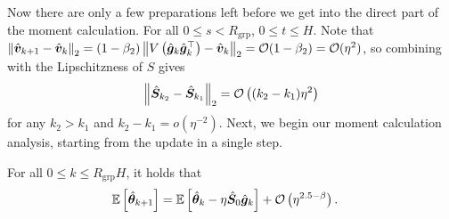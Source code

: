 Now there are only a few preparations left before we get into the direct part of the moment calculation. For all $0 \leq s < R_{\mathrm{grp}}$, $0 \leq t \leq H$. Note that $\left\|\hat{{\bm{v}}}_{k+1} - \hat{{\bm{v}}}_k\right\|_2 = (1-\beta_2) \left\|V\left(\hat{{\bm{g}}}_k\hat{{\bm{g}}}_k^\top\right) - \hat{{\bm{v}}}_k\right\|_2 = \mathcal{O}(1-\beta_2) = \mathcal{O}(\eta^2)$, so combining with the Lipschitzness of $S$ gives $$\left\|\hat{{\bm{S}}}_{k_2} - \hat{{\bm{S}}}_{k_1}\right\|_2 = \mathcal{O}\left((k_2 - k_1) \eta^2\right)$$ for any $k_2 > k_1$ and $k_2 - k_1 = o\left(\eta^{-2}\right)$. Next, we begin our moment calculation analysis, starting from the update in a single step.
\begin{lemma}\label{lma:update-rule}
    For all $0 \leq k \leq R_{\mathrm{grp}}H$, it holds that
    \begin{align*}
        \mathbb{E}\left[\hat{{\bm{\theta}}}_{k+1}\right] &= \mathbb{E}\left[\hat{{\bm{\theta}}}_k - \eta\hat{{\bm{S}}}_0 \hat{{\bm{g}}}_k\right] + \mathcal{O}\left(\eta^{2.5-\beta}\right).
    \end{align*}
\end{lemma}
